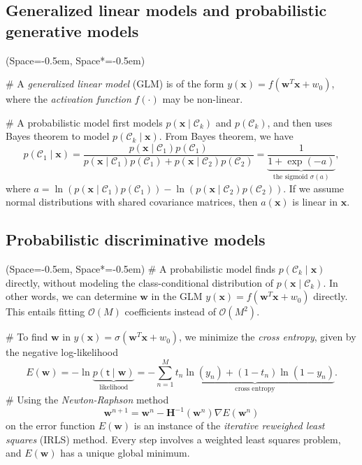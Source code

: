 \documentclass[12pt, a4paper]{article}
\newcommand{\listSpace}{-0.5em}%
\newcommand{\vect}[1]{\bm{#1}}
\begin{document}
\subsection*{Generalized linear models and probabilistic generative models}
\begin{easylist}[itemize]
	\ListProperties(Space=\listSpace, Space*=\listSpace)
	
	# A \emph{generalized linear model} (GLM) is of the form $y(\vect{x}) = f\left( \vect{w}^T \vect{x} + w_0 \right)$, where the \emph{activation function} $f(\cdot)$ may be non-linear.
		
	# A probabilistic model first models $p(\vect{x} \mid \mathcal{C}_k )$ and $p(\mathcal{C}_k)$, and then uses Bayes theorem to model $p(\mathcal{C}_k \mid \vect{x})$.
	From Bayes theorem, we have
	\begin{equation*}
		p(\mathcal{C}_1 \mid \vect{x})
		=
		\frac{p( \vect{x} \mid \mathcal{C}_1) p(\mathcal{C}_1)}{p( \vect{x} \mid \mathcal{C}_1) p(\mathcal{C}_1) + p( \vect{x} \mid \mathcal{C}_2) p(\mathcal{C}_2)}
		=
		\underbrace{\frac{1}{1 + \exp(-a)}}_{\text{the sigmoid } \sigma(a)},
	\end{equation*}
	where $a = 
	\ln \left( p( \vect{x} \mid \mathcal{C}_1) p(\mathcal{C}_1) \right)
	-
	\ln \left( p( \vect{x} \mid \mathcal{C}_2) p(\mathcal{C}_2) \right)$.
	If we assume normal distributions with shared covariance matrices, then $a(\vect{x})$ is linear in $\vect{x}$.
\end{easylist}

\subsection*{Probabilistic discriminative models}
\begin{easylist}[itemize]
	\ListProperties(Space=\listSpace, Space*=\listSpace)
	# A probabilistic model finds $p(\mathcal{C}_k \mid \vect{x})$ directly, without modeling the class-conditional distribution of $p(\vect{x} \mid \mathcal{C}_k)$.
	In other words, we can determine $\vect{w}$ in the GLM $y(\vect{x}) = f\left( \vect{w}^T \vect{x} + w_0 \right)$ directly.
	This entails fitting $\mathcal{O}(M)$ coefficients instead of $\mathcal{O}(M^2)$.
	
	# To find $\vect{w}$ in $y(\vect{x}) = \sigma \left( \vect{w}^T \vect{x} + w_0 \right)$, we minimize the \emph{cross entropy}, given by the negative log-likelihood
	\begin{equation*}
		E(\vect{w}) = 
		- \ln \underbrace{p(\mathsf{t} \mid \vect{w})}_{\text{likelihood}} =
		- \sum_{n=1}^{M} \underbrace{t_n \ln (y_n) + (1 - t_n) \ln (1 - y_n)}_{\text{cross entropy}}.
	\end{equation*}
	# Using the \emph{Newton-Raphson} method
	\begin{equation*}
		\vect{w}^{n+1}
		=
		\vect{w}^{n} - \vect{H}^{-1}(\vect{w}^{n}) \nabla E (\vect{w}^{n})
	\end{equation*}
	on the error function $E(\vect{w})$ is an instance of the \emph{iterative reweighed least squares} (IRLS) method.
	Every step involves a weighted least squares problem, and $E(\vect{w})$ has a unique global minimum.
\end{easylist}
\end{document}
